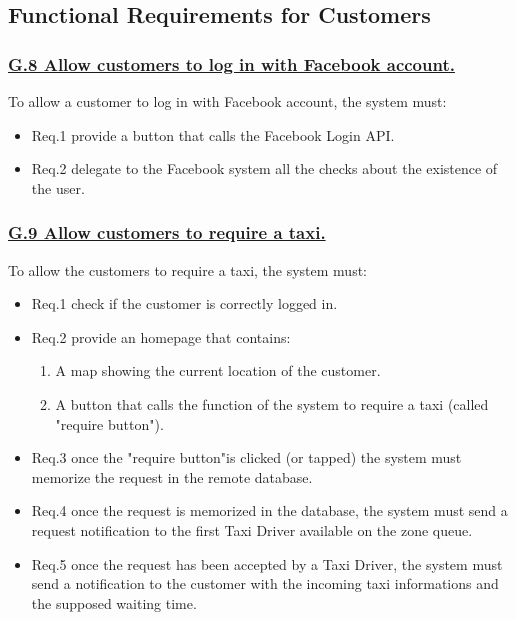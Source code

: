 \documentclass{report}
\begin{document}
		\subsection{Functional Requirements for Customers}

			\subsubsection{\lbrack \hyperref[sec:g8]{G.8 Allow customers to log in with Facebook account.}\rbrack}
			To allow a customer to log in with Facebook account, the system must:

				\begin{itemize}
					\item \lbrack Req.1\rbrack \label{sec:fr1_g8} provide a button that calls the Facebook Login API.
					\item \lbrack Req.2\rbrack \label{sec:fr2_g8} delegate to the Facebook system all the checks about the existence of the user.
				\end{itemize}

			\subsubsection{\lbrack \hyperref[sec:g9]{G.9 Allow customers to require a taxi.}\rbrack}
			To allow the customers to require a taxi, the system must:

				\begin{itemize}
					\item \lbrack Req.1\rbrack \label{sec:fr1_g9} check if the customer is correctly logged in.
					\item \lbrack Req.2\rbrack \label{sec:fr2_g9} provide an homepage that contains:
						\begin{enumerate}
							\item A map showing the current location of the customer.
							\item A button that calls the function of the system to require a taxi (called "require button").
						\end{enumerate}
					\item \lbrack Req.3\rbrack \label{sec:fr3_g9} once the "require button"is clicked (or tapped) the system must memorize the request in the remote database.
					\item \lbrack Req.4\rbrack \label{sec:fr4_g9} once the request is memorized in the database, the system must send a request notification to the first Taxi Driver available on the zone queue.
					\item \lbrack Req.5\rbrack \label{sec:fr5_g9} once the request has been accepted by a Taxi Driver, the system must send a notification to the customer with the incoming taxi informations and the supposed waiting time.
				\end{itemize}
\end{document}
